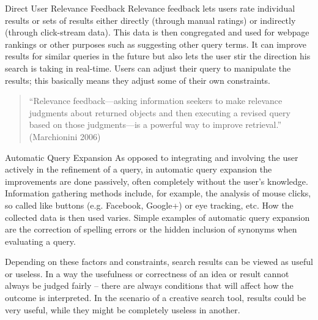 \begin{leftbar}
Direct User Relevance Feedback   Relevance feedback lets users rate individual results or sets of results either directly (through manual ratings) or indirectly (through click-stream data). This data is then congregated and used for webpage rankings or other purposes such as suggesting other query terms. It can improve results for similar queries in the future but also lets the user stir the direction his search is taking in real-time. Users can adjust their query to manipulate the results; this basically means they adjust some of their own constraints.
\end{leftbar}

\begin{quote}
``Relevance feedback—asking information seekers to make relevance judgments about returned objects and then executing a revised query based on those judgments—is a powerful way to improve retrieval.'' (Marchionini 2006)
\end{quote}

\begin{leftbar}
Automatic Query Expansion   As opposed to integrating and involving the user actively in the refinement of a query, in automatic query expansion the improvements are done passively, often completely without the user’s knowledge. Information gathering methods include, for example, the analysis of mouse clicks, so called like buttons (e.g. Facebook, Google+) or eye tracking, etc. How the collected data is then used varies. Simple examples of automatic query expansion are the correction of spelling errors or the hidden inclusion of synonyms when evaluating a query.
\end{leftbar}

\begin{leftbar}
Depending on these factors and constraints, search results can be viewed as useful or useless. In a way the usefulness or correctness of an idea or result cannot always be judged fairly – there are always conditions that will affect how the outcome is interpreted. In the scenario of a creative search tool, results could be very useful, while they might be completely useless in another.
\end{leftbar}


\stopcontents[chapters]
